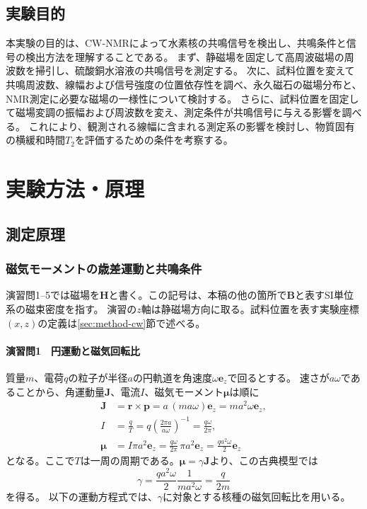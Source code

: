 \documentclass[dvipdfmx,a4paper,11pt]{jsarticle}
\begin{document}
\subsection{実験目的}
本実験の目的は、CW-NMRによって水素核の共鳴信号を検出し、共鳴条件と信号の検出方法を理解することである。
まず、静磁場を固定して高周波磁場の周波数を掃引し、硫酸銅水溶液の共鳴信号を測定する。
次に、試料位置を変えて共鳴周波数、線幅および信号強度の位置依存性を調べ、永久磁石の磁場分布と、NMR測定に必要な磁場の一様性について検討する。
さらに、試料位置を固定して磁場変調の振幅および周波数を変え、測定条件が共鳴信号に与える影響を調べる。
これにより、観測される線幅に含まれる測定系の影響を検討し、物質固有の横緩和時間$T_2$を評価するための条件を考察する。

\section{実験方法・原理}
\label{sec:methods}

\subsection{測定原理}


\subsubsection{磁気モーメントの歳差運動と共鳴条件}
演習問1--5では磁場を$\boldsymbol{H}$と書く。この記号は、本稿の他の箇所で$\boldsymbol{B}$と表すSI単位系の磁束密度を指す。
演習の$z$軸は静磁場方向に取る。試料位置を表す実験座標$(x,z)$の定義は\ref{sec:method-cw}節で述べる。

\paragraph{演習問1　円運動と磁気回転比}
質量$m$、電荷$q$の粒子が半径$a$の円軌道を角速度$\omega\boldsymbol{e}_z$で回るとする。
速さが$a\omega$であることから、角運動量$\boldsymbol{J}$、電流$I$、磁気モーメント$\boldsymbol{\mu}$は順に
\begin{align}
 \boldsymbol{J}&=\boldsymbol{r}\times\boldsymbol{p}
   =a\,(ma\omega)\boldsymbol{e}_z=ma^2\omega\boldsymbol{e}_z,\\
 I&=\frac{q}{T}=q\left(\frac{2\pi a}{a\omega}\right)^{-1}
   =\frac{q\omega}{2\pi},\\
 \boldsymbol{\mu}&=I\pi a^2\boldsymbol{e}_z
   =\frac{q\omega}{2\pi}\,\pi a^2\boldsymbol{e}_z
   =\frac{qa^2\omega}{2}\boldsymbol{e}_z
\end{align}
となる。ここで$T$は一周の周期である。$\boldsymbol{\mu}=\gamma\boldsymbol{J}$より、この古典模型では
\begin{equation}
 \gamma=\frac{qa^2\omega}{2}\frac{1}{ma^2\omega}=\frac{q}{2m}
\end{equation}
を得る。
以下の運動方程式では、$\gamma$に対象とする核種の磁気回転比を用いる。
\end{document}
